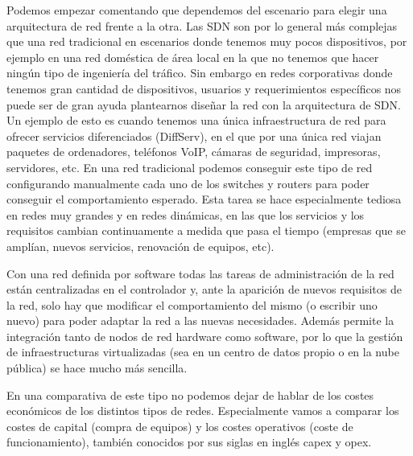 Podemos empezar comentando que dependemos del escenario para elegir una arquitectura de red frente a la otra. Las SDN son por lo general más complejas que una red tradicional en escenarios donde tenemos muy pocos dispositivos, por ejemplo en una red doméstica de área local en la que no tenemos que hacer ningún tipo de ingeniería del tráfico. Sin embargo en redes corporativas donde tenemos gran cantidad de dispositivos, usuarios y requerimientos específicos nos puede ser de gran ayuda plantearnos diseñar la red con la arquitectura de SDN. Un ejemplo de esto es cuando tenemos una única infraestructura de red para ofrecer servicios diferenciados (DiffServ), en el que por una única red viajan paquetes de ordenadores, teléfonos VoIP, cámaras de seguridad, impresoras, servidores, etc. En una red tradicional podemos conseguir este tipo de red configurando manualmente cada uno de los switches y routers para poder conseguir el comportamiento esperado. Esta tarea se hace especialmente tediosa en redes muy grandes y en redes dinámicas, en las que los servicios y los requisitos cambian continuamente a medida que pasa el tiempo (empresas que se amplían, nuevos servicios, renovación de equipos, etc).

Con una red definida por software todas las tareas de administración de la red están centralizadas en el controlador y, ante la aparición de nuevos requisitos de la red, solo hay que modificar el comportamiento del mismo (o escribir uno nuevo) para poder adaptar la red a las nuevas necesidades. Además permite la integración tanto de nodos de red hardware como software, por lo que la gestión de infraestructuras virtualizadas (sea en un centro de datos propio o en la nube pública) se hace mucho más sencilla.

En una comparativa de este tipo no podemos dejar de hablar de los costes económicos de los distintos tipos de redes. Especialmente vamos a comparar los costes de capital (compra de equipos) y los costes operativos (coste de funcionamiento), también conocidos por sus siglas en inglés \acrshort{capex} y \acrshort{opex}.

